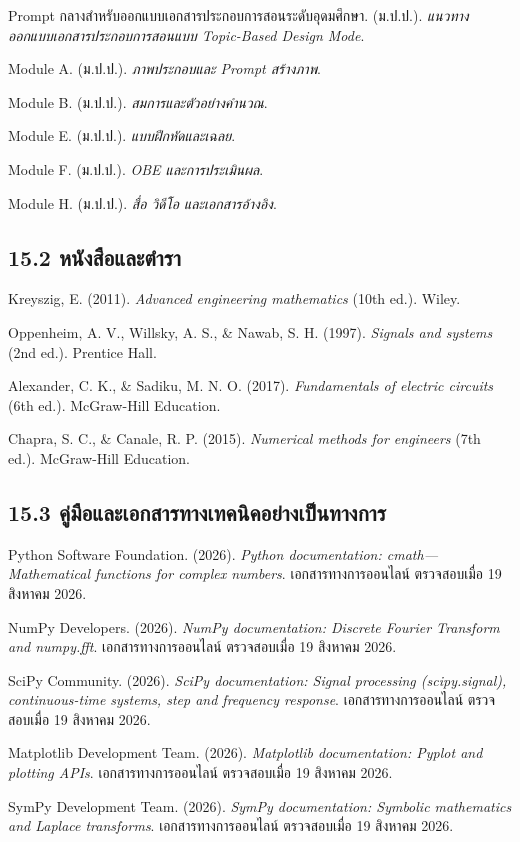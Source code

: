 Prompt กลางสำหรับออกแบบเอกสารประกอบการสอนระดับอุดมศึกษา. (ม.ป.ป.). \textit{แนวทางออกแบบเอกสารประกอบการสอนแบบ Topic-Based Design Mode}.

Module A. (ม.ป.ป.). \textit{ภาพประกอบและ Prompt สร้างภาพ}.

Module B. (ม.ป.ป.). \textit{สมการและตัวอย่างคำนวณ}.

Module E. (ม.ป.ป.). \textit{แบบฝึกหัดและเฉลย}.

Module F. (ม.ป.ป.). \textit{OBE และการประเมินผล}.

Module H. (ม.ป.ป.). \textit{สื่อ วิดีโอ และเอกสารอ้างอิง}.

\subsection{15.2 หนังสือและตำรา}

Kreyszig, E. (2011). \textit{Advanced engineering mathematics} (10th ed.). Wiley.

Oppenheim, A. V., Willsky, A. S., \& Nawab, S. H. (1997). \textit{Signals and systems} (2nd ed.). Prentice Hall.

Alexander, C. K., \& Sadiku, M. N. O. (2017). \textit{Fundamentals of electric circuits} (6th ed.). McGraw-Hill Education.

Chapra, S. C., \& Canale, R. P. (2015). \textit{Numerical methods for engineers} (7th ed.). McGraw-Hill Education.

\subsection{15.3 คู่มือและเอกสารทางเทคนิคอย่างเป็นทางการ}

Python Software Foundation. (2026). \textit{Python documentation: cmath—Mathematical functions for complex numbers}. เอกสารทางการออนไลน์ ตรวจสอบเมื่อ 19 สิงหาคม 2026.

NumPy Developers. (2026). \textit{NumPy documentation: Discrete Fourier Transform and numpy.fft}. เอกสารทางการออนไลน์ ตรวจสอบเมื่อ 19 สิงหาคม 2026.

SciPy Community. (2026). \textit{SciPy documentation: Signal processing (scipy.signal), continuous-time systems, step and frequency response}. เอกสารทางการออนไลน์ ตรวจสอบเมื่อ 19 สิงหาคม 2026.

Matplotlib Development Team. (2026). \textit{Matplotlib documentation: Pyplot and plotting APIs}. เอกสารทางการออนไลน์ ตรวจสอบเมื่อ 19 สิงหาคม 2026.

SymPy Development Team. (2026). \textit{SymPy documentation: Symbolic mathematics and Laplace transforms}. เอกสารทางการออนไลน์ ตรวจสอบเมื่อ 19 สิงหาคม 2026.

